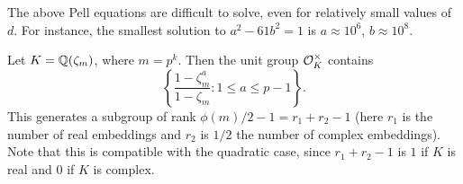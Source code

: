 \begin{remark}
  The above Pell equations are difficult to solve, even for
  relatively small values of $d$. For instance, the
  smallest solution to $a^2 - 61 b^2 = 1$ is
  $a \approx 10^6$, $b \approx 10^8$.
\end{remark}

\begin{example}
  Let $K = \mathbb{Q}(\zeta_m)$, where $m = p^k$. Then the unit group
  $\mathcal{O}_K^\times$ contains
  \[
    \left\{
      \frac{1 - \zeta_m^a}{1 - \zeta_m} : 1 \le a \le p - 1
    \right\}.
  \]
  This generates a subgroup of rank $\phi(m) / 2 - 1 = r_1 + r_2 - 1$ (here $r_1$ is the number of real embeddings
  and $r_2$ is $1 / 2$ the number of complex embeddings).
  Note that this is compatible with the quadratic case,
  since $r_1 + r_2 - 1$ is $1$ if $K$ is real and $0$ if $K$
  is complex.
\end{example}
